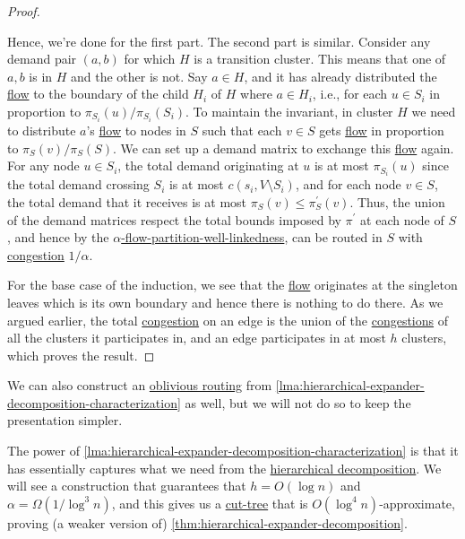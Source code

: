 \begin{proof}
\begin{explanation}
	\end{explanation}
	Hence, we're done for the first part. The second part is similar. Consider any demand pair \((a, b)\) for which \(H\) is a transition cluster. This means that one of \(a, b\) is in \(H\) and the other is not. Say \(a \in H\), and it has already distributed the \hyperref[def:flow]{flow} to the boundary of the child \(H_i\) of \(H\) where \(a \in H_i\), i.e., for each \(u \in S_i\) in proportion to \(\pi _{S_i}(u) / \pi _{S_i}(S_i)\). To maintain the invariant, in cluster \(H\) we need to distribute \(a\)'s \hyperref[def:flow]{flow} to nodes in \(S\) such that each \(v \in S\) gets \hyperref[def:flow]{flow} in proportion to \(\pi _S(v) / \pi _S(S)\). We can set up a demand matrix to exchange this \hyperref[def:flow]{flow} again. For any node \(u \in S_i\), the total demand originating at \(u\) is at most \(\pi _{S_i}(u)\) since the total demand crossing \(S_i\) is at most \(c(s_i, V\setminus S_i)\), and for each node \(v \in S\), the total demand that it receives is at most \(\pi _S(v) \leq \pi _S^{\prime} (v)\). Thus, the union of the demand matrices respect the total bounds imposed by \(\pi ^{\prime} \) at each node of \(S\), and hence by the \hyperref[def:partition-and-boundary-well-linked]{\(\alpha \)-flow-partition-well-linkedness}, can be routed in \(S\) with \hyperref[def:congestion]{congestion} \(1 / \alpha \).

	For the base case of the induction, we see that the \hyperref[def:flow]{flow} originates at the singleton leaves which is its own boundary and hence there is nothing to do there. As we argued earlier, the total \hyperref[def:congestion]{congestion} on an edge is the union of the \hyperref[def:congestion]{congestions} of all the clusters it participates in, and an edge participates in at most \(h\) clusters, which proves the result.
\end{proof}

\begin{remark}
	We can also construct an \hyperref[def:oblivious-routing-scheme]{oblivious routing} from \autoref{lma:hierarchical-expander-decomposition-characterization} as well, but we will not do so to keep the presentation simpler.
\end{remark}

The power of \autoref{lma:hierarchical-expander-decomposition-characterization} is that it has essentially captures what we need from the \hyperref[def:hierarchical-decomposition]{hierarchical decomposition}. We will see a construction that guarantees that \(h = O(\log n)\) and \(\alpha = \Omega (1 / \log ^3 n)\), and this gives us a \hyperref[def:cut-tree]{cut-tree} that is \(O(\log ^4 n)\)-approximate, proving (a weaker version of) \autoref{thm:hierarchical-expander-decomposition}.